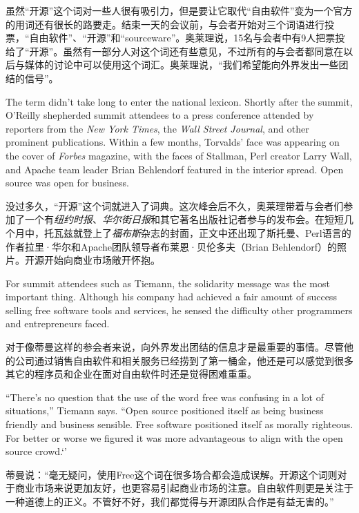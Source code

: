 \ifdefined\chs
虽然``开源''这个词对一些人很有吸引力，但是要让它取代``自由软件''变为一个官方的用词还有很长的路要走。结束一天的会议前，与会者开始对三个词语进行投票，``自由软件''、``开源''和``sourceware''。奥莱理说，15名与会者中有9人把票投给了``开源''。虽然有一部分人对这个词还有些意见，不过所有的与会者都同意在以后与媒体的讨论中可以使用这个词汇。奥莱理说，``我们希望能向外界发出一些团结的信号''。
\fi

\ifdefined\eng
The term didn't take long to enter the national lexicon. Shortly after the summit, O'Reilly shepherded summit attendees to a press conference attended by reporters from the \textit{New York Times}, the \textit{Wall Street Journal}, and other prominent publications. Within a few months, Torvalds' face was appearing on the cover of \textit{Forbes} magazine, with the faces of Stallman, Perl creator Larry Wall, and Apache team leader Brian Behlendorf featured in the interior spread. Open source was open for business.
\fi

\ifdefined\chs
没过多久，``开源''这个词就进入了词典。这次峰会后不久，奥莱理带着与会者们参加了一个有\textit{纽约时报}、\textit{华尔街日报}和其它著名出版社记者参与的发布会。在短短几个月中，托瓦兹就登上了\textit{福布斯}杂志的封面，正文中还出现了斯托曼、Perl语言的作者拉里·华尔和Apache团队领导者布莱恩·贝伦多夫（Brian Behlendorf）的照片。开源开始向商业市场敞开怀抱。
\fi

\ifdefined\eng
For summit attendees such as Tiemann, the solidarity message was the most important thing. Although his company had achieved a fair amount of success selling free software tools and services, he sensed the difficulty other programmers and entrepreneurs faced.
\fi

\ifdefined\chs
对于像蒂曼这样的参会者来说，向外界发出团结的信息才是最重要的事情。尽管他的公司通过销售自由软件和相关服务已经捞到了第一桶金，他还是可以感觉到很多其它的程序员和企业在面对自由软件时还是觉得困难重重。
\fi

\ifdefined\eng
``There's no question that the use of the word free was confusing in a lot of situations,'' Tiemann says. ``Open source positioned itself as being business friendly and business sensible. Free software positioned itself as morally righteous. For better or worse we figured it was more advantageous to align with the open source crowd.‘’
\fi

\ifdefined\chs
蒂曼说：``毫无疑问，使用Free这个词在很多场合都会造成误解。开源这个词则对于商业市场来说更加友好，也更容易引起商业市场的注意。自由软件则更是关注于一种道德上的正义。不管好不好，我们都觉得与开源团队合作是有益无害的。''
\fi

